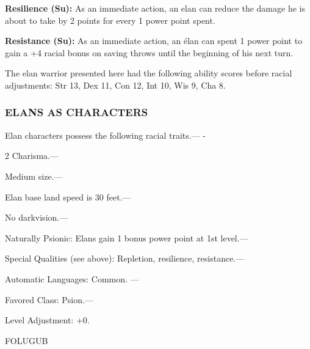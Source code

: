 \documentclass{article}
\begin{document}
\textbf{Resilience (Su): }As an immediate action, an elan can reduce the damage 
he is about to take by 2 points for every 1 power point spent.

\textbf{Resistance (Su):} As an immediate action, an élan can spent 1 power point 
to gain a +4 racial bonus on saving throws until the beginning of his next turn.

The elan warrior presented here had the following ability scores before racial 
adjustments: Str 13, Dex 11, Con 12, Int 10, Wis 9, Cha 8.

\subsubsection*{ELANS AS CHARACTERS}

Elan characters possess the following racial traits.--- -

\parindent=3pt
2 Charisma.---

\parindent=0pt
Medium size.---

Elan base land speed is 30 feet.---

No darkvision.---

Naturally Psionic: Elans gain 1 bonus power point at 1st level.---

Special Qualities (see above): Repletion, resilience, resistance.---

Automatic Languages: Common. ---

Favored Class: Psion.---

Level Adjustment: +0.

\vspace{12pt}
{\LARGE{}FOLUGUB}
\end{document}
